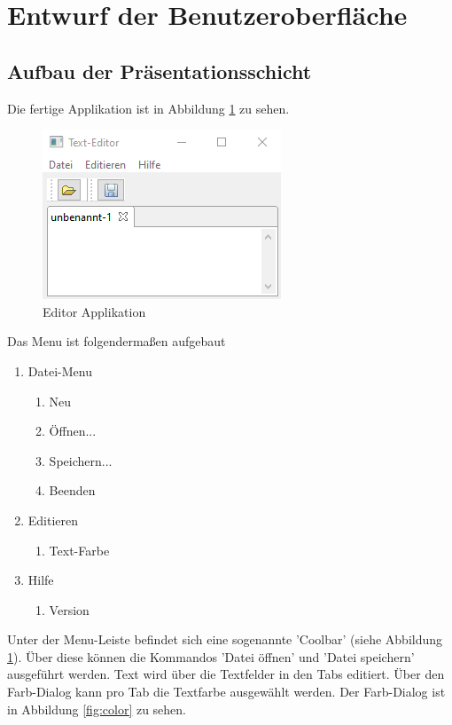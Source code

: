 \section{Entwurf der Benutzeroberfläche}

\subsection{Aufbau der Präsentationsschicht}

Die fertige Applikation ist in Abbildung \ref{fig:app} zu sehen.

\begin{figure}[H]
    \centering
    \includegraphics[width=0.5\linewidth]{figures/app/application.png}
    \caption{Editor Applikation}
    \label{fig:app}
\end{figure}

Das Menu ist folgendermaßen aufgebaut

\begin{enumerate}
\item Datei-Menu
    \begin{enumerate}
    \item Neu
    \item Öffnen...
    \item Speichern...
    \item Beenden
    \end{enumerate}
\item Editieren
    \begin{enumerate}
    \item Text-Farbe
    \end{enumerate}
\item Hilfe
    \begin{enumerate}
    \item Version
    \end{enumerate}
\end{enumerate}

\noindent
Unter der Menu-Leiste befindet sich eine sogenannte 'Coolbar' (siehe Abbildung \ref{fig:app}).
Über diese können die Kommandos 'Datei öffnen' und 'Datei speichern' ausgeführt werden.
Text wird über die Textfelder in den Tabs editiert. Über den Farb-Dialog kann pro Tab die 
Textfarbe ausgewählt werden. Der Farb-Dialog ist in Abbildung \ref{fig:color} zu sehen.

